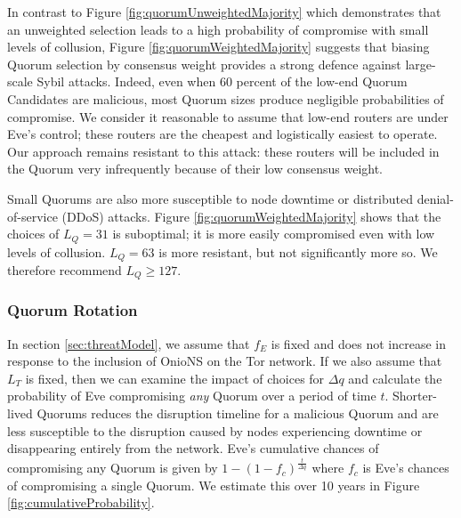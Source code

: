 \documentclass[USenglish,oneside,twocolumn]{article}
\begin{document}
In contrast to Figure \ref{fig:quorumUnweightedMajority} which demonstrates that an unweighted selection leads to a high probability of compromise with small levels of collusion, Figure \ref{fig:quorumWeightedMajority} suggests that biasing Quorum selection by consensus weight provides a strong defence against large-scale Sybil attacks. Indeed, even when 60 percent of the low-end Quorum Candidates are malicious, most Quorum sizes produce negligible probabilities of compromise. We consider it reasonable to assume that low-end routers are under Eve's control; these routers are the cheapest and logistically easiest to operate. Our approach remains resistant to this attack: these routers will be included in the Quorum very infrequently because of their low consensus weight.

Small Quorums are also more susceptible to node downtime or distributed denial-of-service (DDoS) attacks. Figure \ref{fig:quorumWeightedMajority} shows that the choices of $ L_{Q} = 31 $ is suboptimal; it is more easily compromised even with low levels of collusion. $ L_{Q} = 63 $ is more resistant, but not significantly more so. We therefore recommend $ L_{Q} \geq 127 $.

\subsubsection{Quorum Rotation}
\label{sec:qRotation}

In section \ref{sec:threatModel}, we assume that $ f_{E} $ is fixed and does not increase in response to the inclusion of OnioNS on the Tor network. If we also assume that $ L_{T} $ is fixed, then we can examine the impact of choices for $ \Delta q $ and calculate the probability of Eve compromising \emph{any} Quorum over a period of time $ t $. Shorter-lived Quorums reduces the disruption timeline for a malicious Quorum and are less susceptible to the disruption caused by nodes experiencing downtime or disappearing entirely from the network. Eve's cumulative chances of compromising any Quorum is given by $ 1 - (1 - f_{c})^{\frac{t}{\Delta q}} $ where $ f_{c} $ is Eve's chances of compromising a single Quorum. We estimate this over 10 years in Figure \ref{fig:cumulativeProbability}.
\end{document}
